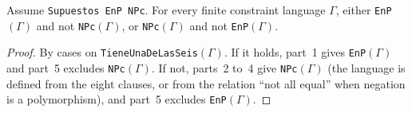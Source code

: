 \begin{theorem}
  \label{thm:arrow-dichotomy}
  \leanok
  Assume \texttt{Supuestos EnP NPc}. For every finite constraint language $\Gamma$, either
  \texttt{EnP}$(\Gamma)$ and not \texttt{NPc}$(\Gamma)$, or \texttt{NPc}$(\Gamma)$ and not
  \texttt{EnP}$(\Gamma)$.
  \own{}
\end{theorem}

\begin{proof}
  \leanok
  By cases on \texttt{TieneUnaDeLasSeis}$(\Gamma)$. If it holds, part~1 gives \texttt{EnP}$(\Gamma)$
  and part~5 excludes \texttt{NPc}$(\Gamma)$. If not, parts~2 to~4 give \texttt{NPc}$(\Gamma)$ (the
  language is defined from the eight clauses, or from the relation ``not all equal'' when negation is
  a polymorphism), and part~5 excludes \texttt{EnP}$(\Gamma)$.
\end{proof}
